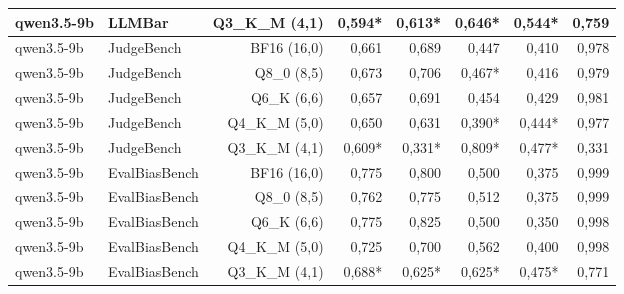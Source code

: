 \begin{tabular}{llrrrrrr}
qwen3.5-9b & LLMBar & Q3\_K\_M (4,1) & 0,594* & 0,613* & 0,646* & 0,544* & 0,759 \\
\midrule
qwen3.5-9b & JudgeBench & BF16 (16,0) & 0,661 & 0,689 & 0,447 & 0,410 & 0,978 \\
qwen3.5-9b & JudgeBench & Q8\_0 (8,5) & 0,673 & 0,706 & 0,467* & 0,416 & 0,979 \\
qwen3.5-9b & JudgeBench & Q6\_K (6,6) & 0,657 & 0,691 & 0,454 & 0,429 & 0,981 \\
qwen3.5-9b & JudgeBench & Q4\_K\_M (5,0) & 0,650 & 0,631 & 0,390* & 0,444* & 0,977 \\
qwen3.5-9b & JudgeBench & Q3\_K\_M (4,1) & 0,609* & 0,331* & 0,809* & 0,477* & 0,331 \\
\midrule
qwen3.5-9b & EvalBiasBench & BF16 (16,0) & 0,775 & 0,800 & 0,500 & 0,375 & 0,999 \\
qwen3.5-9b & EvalBiasBench & Q8\_0 (8,5) & 0,762 & 0,775 & 0,512 & 0,375 & 0,999 \\
qwen3.5-9b & EvalBiasBench & Q6\_K (6,6) & 0,775 & 0,825 & 0,500 & 0,350 & 0,998 \\
qwen3.5-9b & EvalBiasBench & Q4\_K\_M (5,0) & 0,725 & 0,700 & 0,562 & 0,400 & 0,998 \\
qwen3.5-9b & EvalBiasBench & Q3\_K\_M (4,1) & 0,688* & 0,625* & 0,625* & 0,475* & 0,771 \\
\bottomrule
\end{tabular}

